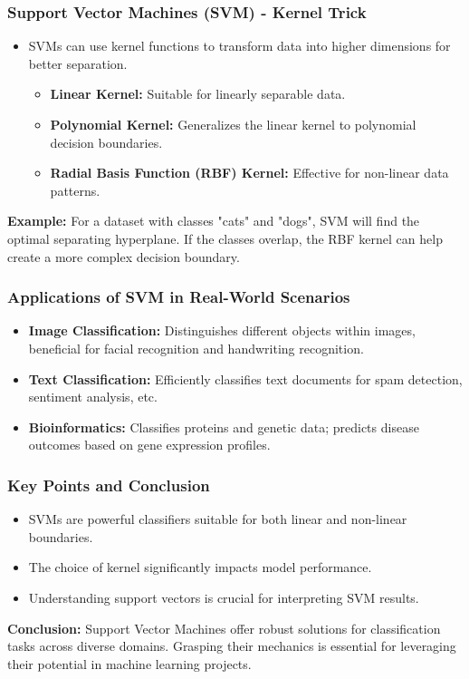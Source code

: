 \documentclass[aspectratio=169]{beamer}
\begin{document}
\begin{frame}[fragile]
    \frametitle{Support Vector Machines (SVM) - Kernel Trick}
    \begin{itemize}
        \item SVMs can use kernel functions to transform data into higher dimensions for better separation.
        \begin{itemize}
            \item \textbf{Linear Kernel:} Suitable for linearly separable data.
            \item \textbf{Polynomial Kernel:} Generalizes the linear kernel to polynomial decision boundaries.
            \item \textbf{Radial Basis Function (RBF) Kernel:} Effective for non-linear data patterns.
        \end{itemize}
    \end{itemize}
    
    \textbf{Example:} For a dataset with classes "cats" and "dogs", SVM will find the optimal separating hyperplane. If the classes overlap, the RBF kernel can help create a more complex decision boundary.
\end{frame}

\begin{frame}[fragile]
    \frametitle{Applications of SVM in Real-World Scenarios}
    \begin{itemize}
        \item \textbf{Image Classification:} Distinguishes different objects within images, beneficial for facial recognition and handwriting recognition.
        \item \textbf{Text Classification:} Efficiently classifies text documents for spam detection, sentiment analysis, etc.
        \item \textbf{Bioinformatics:} Classifies proteins and genetic data; predicts disease outcomes based on gene expression profiles.
    \end{itemize}
\end{frame}

\begin{frame}[fragile]
    \frametitle{Key Points and Conclusion}
    \begin{itemize}
        \item SVMs are powerful classifiers suitable for both linear and non-linear boundaries.
        \item The choice of kernel significantly impacts model performance.
        \item Understanding support vectors is crucial for interpreting SVM results.
    \end{itemize}
    
    \textbf{Conclusion:} Support Vector Machines offer robust solutions for classification tasks across diverse domains. Grasping their mechanics is essential for leveraging their potential in machine learning projects.
\end{frame}
\end{document}
